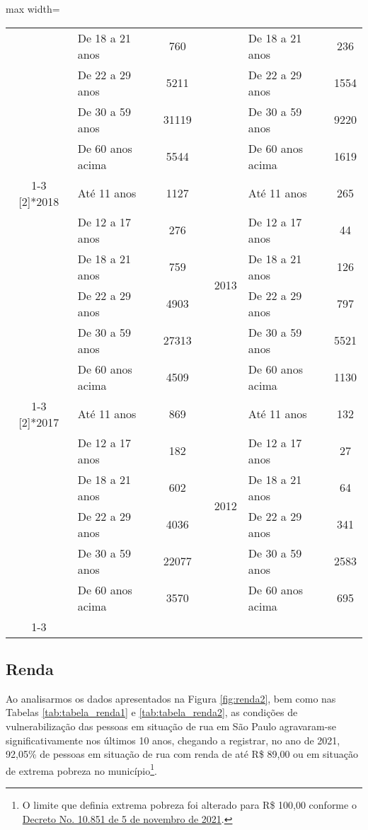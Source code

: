 \documentclass[14pt]{extarticle}
\begin{document}
\begin{table}[htbp]
\begin{adjustbox}{max width=\linewidth}
\begin{tabular}{clcrclc}
         & De 18 a 21 anos & 760  &      &      & De 18 a 21 anos & 236 \\
         & De 22 a 29 anos & 5211 &      &      & De 22 a 29 anos & 1554 \\
         & De 30 a 59 anos & 31119 &      &      & De 30 a 59 anos & 9220 \\
         & De 60 anos acima & 5544 &      &      & De 60 anos acima & 1619 \\
\cmidrule{1-3}\cmidrule{5-7}    \multirow{6}[2]{*}{2018} & Até 11 anos & 1127 &      & \multirow{6}[2]{*}{2013} & Até 11 anos & 265 \\
         & De 12 a 17 anos & 276  &      &      & De 12 a 17 anos & 44 \\
         & De 18 a 21 anos & 759  &      &      & De 18 a 21 anos & 126 \\
         & De 22 a 29 anos & 4903 &      &      & De 22 a 29 anos & 797 \\
         & De 30 a 59 anos & 27313 &      &      & De 30 a 59 anos & 5521 \\
         & De 60 anos acima & 4509 &      &      & De 60 anos acima & 1130 \\
\cmidrule{1-3}\cmidrule{5-7}    \multirow{6}[2]{*}{2017} & Até 11 anos & 869  &      & \multirow{6}[2]{*}{2012} & Até 11 anos & 132 \\
         & De 12 a 17 anos & 182  &      &      & De 12 a 17 anos & 27 \\
         & De 18 a 21 anos & 602  &      &      & De 18 a 21 anos & 64 \\
         & De 22 a 29 anos & 4036 &      &      & De 22 a 29 anos & 341 \\
         & De 30 a 59 anos & 22077 &      &      & De 30 a 59 anos & 2583 \\
         & De 60 anos acima & 3570 &      &      & De 60 anos acima & 695 \\
\cmidrule{1-3}\cmidrule{5-7}    
\end{tabular}%
\end{adjustbox}
  \label{tab:tab_faixa_etaria_num_abso}%
\end{table}%


\subsection{Renda}
\label{sub_renda}


Ao analisarmos os dados apresentados na Figura \ref{fig:renda2}, bem como nas Tabelas \ref{tab:tabela_renda1} e \ref{tab:tabela_renda2}, as condições de vulnerabilização das pessoas em situação de rua em São Paulo agravaram-se significativamente nos últimos 10 anos, chegando a registrar, no ano de 2021, 92,05\% de pessoas em situação de rua com renda de até R\$ 89,00 ou em situação de extrema pobreza no município\footnote{O limite que definia extrema pobreza foi alterado para R\$ 100,00 conforme o \href{https://www.in.gov.br/en/web/dou/-/decreto-n-10.851-de-5-de-novembro-de-2021-357327251}{Decreto No. 10.851 de 5 de novembro de 2021}.}.\\ 
\end{document}

